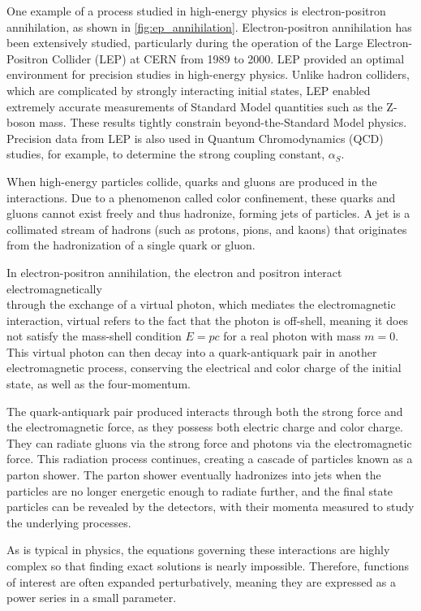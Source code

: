 \documentclass[../main.tex]{subfiles}
\begin{document}
One example of a process studied in high-energy physics is electron-positron annihilation, as shown in \cref{fig:ep_annihilation}. 
Electron-positron annihilation has been extensively studied, particularly during the operation of the Large Electron-Positron Collider (LEP) at CERN from 1989 to 2000. 
LEP provided an optimal environment for precision studies in high-energy physics. 
Unlike hadron colliders, which are complicated by strongly interacting initial states, LEP enabled extremely accurate measurements of Standard Model quantities such as the Z-boson mass. 
These results tightly constrain beyond-the-Standard Model physics. Precision data from LEP is also used in Quantum Chromodynamics (QCD) studies, for example, to determine the strong coupling constant, $\alpha_S$.

When high-energy particles collide, quarks and gluons are produced in the interactions. Due to a phenomenon called color confinement, 
these quarks and gluons cannot exist freely and thus hadronize, forming jets of particles. A jet is a collimated stream of hadrons (such as protons, pions, and kaons)
that originates from the hadronization of a single quark or gluon.

In electron-positron annihilation, the electron and positron interact electromagnetically \\
through the exchange of a virtual photon, which mediates the electromagnetic interaction, virtual refers 
to the fact that the photon is off-shell, meaning it does not satisfy the mass-shell condition $E = pc$ for a real photon with mass $m=0$. 
This virtual photon can then decay into a quark-antiquark pair in another electromagnetic process, conserving the electrical and color charge of the initial state, as well as the four-momentum.

The quark-antiquark pair produced interacts through both the strong force and the electromagnetic force, as they possess both electric charge and color charge.
They can radiate gluons via the strong force and photons via the electromagnetic force. This radiation process continues, creating a cascade of particles known as a parton shower.
The parton shower eventually hadronizes into jets when the particles are no longer energetic enough to radiate further, and the final state particles can be revealed by the detectors, with their momenta measured to study the underlying processes.


As is typical in physics, the equations governing these interactions are highly complex so that finding exact solutions is nearly impossible.
Therefore, functions of interest are often expanded perturbatively, meaning they are expressed as a power series in a small parameter.
\end{document}
